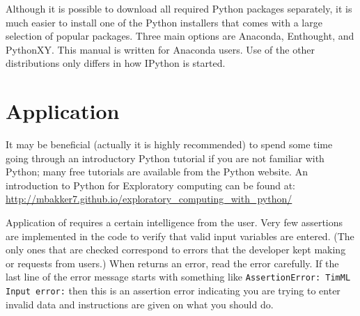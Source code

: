 \documentclass [10pt,letterpaper] {article}
\begin{document}
Although it is possible to download all required Python packages separately, it is much easier to install one of the Python installers that comes with a large selection of popular packages. Three main options are Anaconda, Enthought, and PythonXY. This manual is written for Anaconda users. Use of the other distributions only differs in how IPython is started.


\newpage

\section{Application}
It may be beneficial (actually it is highly recommended) to spend some time
going through an introductory Python tutorial if you are not familiar with
Python; many free tutorials are available from the Python website. An introduction to Python for Exploratory computing can be found at: \url{http://mbakker7.github.io/exploratory_computing_with_python/}

Application
of \Timsp requires a certain intelligence from the user. Very few assertions
are implemented in the code to verify that valid input variables are entered.
(The only ones that are checked correspond to errors that the developer kept
making or requests from users.) When \Timsp returns an error, read the error carefully. If the last
line of the error message starts with something like {\tt AssertionError: TimML Input error:}
then this is an assertion error indicating you are trying to enter invalid
data and instructions are given on what you should do.
\end{document}
